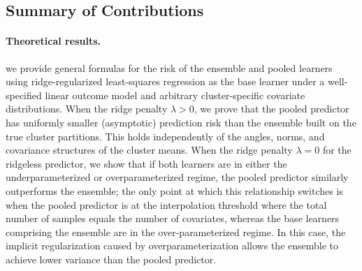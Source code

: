 \documentclass{article}
\theoremstyle{plain}
\theoremstyle{remark}
\begin{document}

\subsection{Summary of Contributions}

\paragraph{Theoretical results.} we provide general formulas for the risk of the ensemble and pooled learners using ridge-regularized least-squares regression as the base learner under a well-specified linear outcome model and arbitrary cluster-specific covariate distributions. When the ridge penalty $\lambda > 0$, we prove that the pooled predictor has uniformly smaller (asymptotic) prediction risk than the ensemble built on the true cluster partitions. This holds independently of the angles, norms, and covariance structures of the cluster means. When the ridge penalty $\lambda = 0$ for the ridgeless predictor, we show that if both learners are in either the underparameterized or overparameterized regime, the pooled predictor similarly outperforms the ensemble; the only point at which this relationship switches is when the pooled predictor is at the interpolation threshold where the total number of samples equals the number of covariates, whereas the base learners comprising the ensemble are in the over-parameterized regime. In this case, the implicit regularization caused by overparameterization allows the ensemble to achieve lower variance than the pooled predictor.
\end{document}
